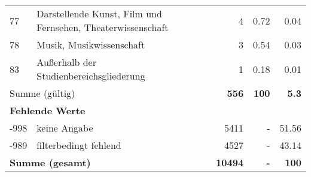\begin{longtable}{lXrrr}
        77 & \multicolumn{1}{X}{Darstellende Kunst, Film und Fernsehen, Theaterwissenschaft} & %
          \num{4} &
          \num[round-mode=places,round-precision=2]{0,72} &
          \num[round-mode=places,round-precision=2]{0,04} \\

        78 & \multicolumn{1}{X}{Musik, Musikwissenschaft} & %
          \num{3} &
          \num[round-mode=places,round-precision=2]{0,54} &
          \num[round-mode=places,round-precision=2]{0,03} \\

        83 & \multicolumn{1}{X}{Außerhalb der Studienbereichsgliederung} & %
          \num{1} &
          \num[round-mode=places,round-precision=2]{0,18} &
          \num[round-mode=places,round-precision=2]{0,01} \\

     \midrule
     \multicolumn{2}{l}{Summe (gültig)} &
       \textbf{\num{556}} &
     \textbf{100} &
       \textbf{\num[round-mode=places,round-precision=2]{5,3}} \\
     \multicolumn{5}{l}{\textbf{Fehlende Werte}}\\
       -998 &
       keine Angabe &
         \num{5411} &
        - &
         \num[round-mode=places,round-precision=2]{51,56} \\
       -989 &
       filterbedingt fehlend &
         \num{4527} &
        - &
         \num[round-mode=places,round-precision=2]{43,14} \\
     \midrule
     \multicolumn{2}{l}{\textbf{Summe (gesamt)}} &
          \textbf{\num{10494}} &
        \textbf{-} &
        \textbf{100} \\
     \bottomrule
     \end{longtable}
     
